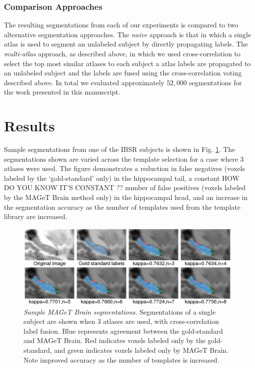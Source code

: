\documentclass{article}
\begin{document}
\subsubsection{Comparison Approaches}
The resulting segmentations from each of our experiments is compared to two
alternative segmentation approaches. The {\it naive} approach is that in  which
a single atlas is used to segment an unlabeled subject by directly propagating
labels.  The {\it multi-atlas} approach, as described above, in which we used
cross-correlation to select the top most similar atlases to each subject a
atlas
labels are propagated to an unlabeled subject and the labels are fused using
the cross-correlation voting described above.  In total we evaluated
approximately $52,000$ segmentations for the work presented in this manuscript.


\section{Results}

Sample segmentations from one of the IBSR subjects is shown in Fig.
\ref{montage}.  The segmentations shown are varied across the template
selection for a case where 3 atlases were used.  The figure demonstrates a
reduction in false negatives (voxels labeled by the `gold-standard' only)
in the hippocampal tail, a constant {HOW DO YOU KNOW IT'S CONSTANT ??}  number of false positives (voxels
labeled by the MAGeT Brain method only) in the hippocampal head, and an
increase in the segmentation accuracy as the number of templates used from
the template library are increased.  

\begin{figure}[h]
\begin{minipage}[b]{1.0\linewidth}
  \centering
  \includegraphics[width=\textwidth]{montage.png}
\end{minipage}
\caption{{\em Sample MAGeT Brain segmentations.} Segmentations of a single
subject are shown when 3 atlases are used, with cross-correlation label
fusion. Blue represents agreement between the gold-standard and MAGeT
Brain.  Red indicates voxels labeled only by the gold-standard, and green
indicates voxels labeled only by MAGeT Brain. Note improved accuracy as the
number of templates is increased.} 
\label{montage}
\end{figure}
\end{document}
